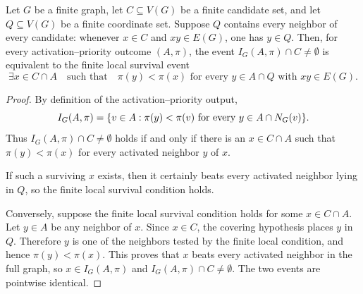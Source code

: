 \begin{helper}
Let \(G\) be a finite graph, let \(C\subseteq V(G)\) be a finite candidate
set, and let \(Q\subseteq V(G)\) be a finite coordinate set.  Suppose \(Q\)
contains every neighbor of every candidate: whenever \(x\in C\) and
\(xy\in E(G)\), one has \(y\in Q\).  Then, for every activation--priority
outcome \((A,\pi)\), the event \(I_G(A,\pi)\cap C\ne\emptyset\) is equivalent
to the finite local survival event
\[
\exists x\in C\cap A\quad
  \text{such that}\quad
  \pi(y)<\pi(x)
  \text{ for every }y\in A\cap Q\text{ with }xy\in E(G).
\]
\end{helper}
\begin{proof}
By definition of the activation--priority output,
\[
I_G(A,\pi)=\{v\in A:\pi(y)<\pi(v)\hbox{ for every }y\in A\cap N_G(v)\}.
\]
Thus \(I_G(A,\pi)\cap C\ne\emptyset\) holds if and only if there is an
\(x\in C\cap A\) such that \(\pi(y)<\pi(x)\) for every activated neighbor
\(y\) of \(x\).

If such a surviving \(x\) exists, then it certainly beats every activated
neighbor lying in \(Q\), so the finite local survival condition holds.

Conversely, suppose the finite local survival condition holds for some
\(x\in C\cap A\).  Let \(y\in A\) be any neighbor of \(x\).  Since \(x\in C\),
the covering hypothesis places \(y\) in \(Q\).  Therefore \(y\) is one of the
neighbors tested by the finite local condition, and hence
\(\pi(y)<\pi(x)\).  This proves that \(x\) beats every activated neighbor in
the full graph, so \(x\in I_G(A,\pi)\) and
\(I_G(A,\pi)\cap C\ne\emptyset\).  The two events are pointwise identical.
\end{proof}
